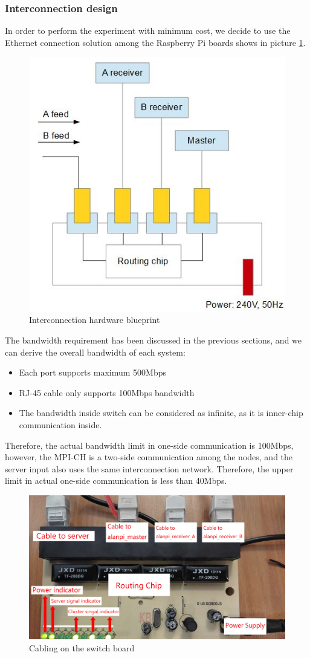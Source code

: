 \documentclass[11pt,openright,a4paper]{report}
\begin{document}
\subsubsection{Interconnection design}
In order to perform the experiment with minimum cost, we decide to use the Ethernet connection solution among the Raspberry Pi boards shows in picture \ref{fig:hardwareDesign}.\\  
\begin{figure}[H]
\centering
\includegraphics[width=0.5\linewidth]{picture/hardwareDesign}
\caption{Interconnection hardware blueprint}
\label{fig:hardwareDesign}
\end{figure}
The bandwidth requirement has been discussed in the previous sections, and we can derive the overall bandwidth of each system:\\
\begin{itemize}
	\item Each port supports maximum 500Mbps
	\item RJ-45 cable only supports 100Mbps bandwidth\cite{kunz1999rj}
	\item The bandwidth inside switch can be considered as infinite, as it is inner-chip communication inside.
\end{itemize}
Therefore, the actual bandwidth limit in one-side communication is 100Mbps, however, the MPI-CH is a two-side communication among the nodes, and the server input also uses the same interconnection network. Therefore, the upper limit in actual one-side communication is less than 40Mbps.\\
\begin{figure}[H]
	\centering
	\includegraphics[width=0.5\linewidth]{picture/photo/SwitchConnection}
	\caption{Cabling on the switch board}
	\label{fig:SwitchConnection}
\end{figure}
\end{document}
